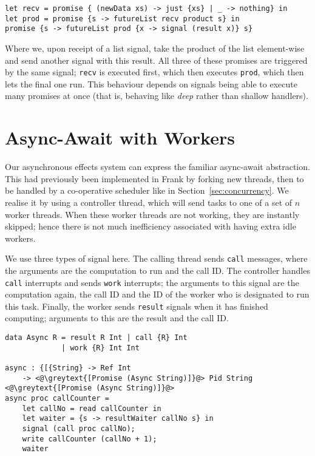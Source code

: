 \documentclass[msc,deptreport,cs]{infthesis} %
\newcommand{\code}[1]{\lstinline{#1}}
\newcommand{\greytext}[1]{\textcolor{black!40}{#1}}
\begin{document}
\begin{lstlisting}
let recv = promise { (newData xs) -> just {xs} | _ -> nothing} in
let prod = promise {s -> futureList recv product s} in
promise {s -> futureList prod {x -> signal (result x)} s}
\end{lstlisting}

\noindent Where we, upon receipt of a list signal, take the product of the list
element-wise and send another signal with this result. All three of these
promises are triggered by the same signal; \code{recv} is executed first, which
then executes \code{prod}, which then lets the final one run. This behaviour
depends on signals being able to execute many promises at once (that is,
behaving like \emph{deep} rather than shallow handlers).

\section{Async-Await with Workers}
\label{sec:async-await}

Our asynchronous effects system can express the familiar async-await
abstraction. This had previously been implemented in Frank by forking new
threads, then to be handled by a co-operative scheduler like in
Section~\ref{sec:concurrency}. We realise it by using a controller thread, which
will send tasks to one of a set of $n$ worker threads. When these worker threads
are not working, they are instantly skipped; hence there is not much
inefficiency associated with having extra idle workers.

We use three types of signal here. The calling thread sends \code{call}
messages, where the arguments are the computation to run and the call ID. The
controller handles \code{call} interrupts and sends \code{work} interrupts; the
arguments to this signal are the computation again, the call ID and the ID of
the worker who is designated to run this task. Finally, the worker sends
\code{result} signals when it has finished computing; arguments to this are the
result and the call ID.

\begin{lstlisting}
data Async R = result R Int | call {R} Int
             | work {R} Int Int

async : {[{String} -> Ref Int
    -> <@\greytext{[Promise (Async String)]}@> Pid String <@\greytext{[Promise (Async String)]}@>
async proc callCounter =
    let callNo = read callCounter in
    let waiter = {s -> resultWaiter callNo s} in
    signal (call proc callNo);
    write callCounter (callNo + 1);
    waiter
\end{lstlisting}
\end{document}
